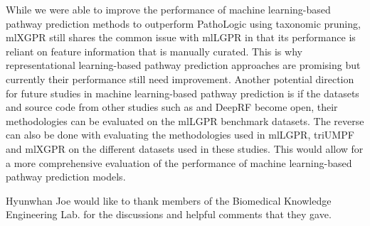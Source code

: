\documentclass[sn-mathphys,Numbered]{sn-jnl}%
\theoremstyle{thmstyleone}%
\theoremstyle{thmstyletwo}%
\theoremstyle{thmstylethree}%
\begin{document}
While we were able to improve the performance of machine learning-based pathway prediction methods to outperform PathoLogic using taxonomic pruning, mlXGPR still shares the common issue with mlLGPR in that its performance is reliant on feature information that is manually curated.
This is why representational learning-based pathway prediction approaches are promising but currently their performance still need improvement.
Another potential direction for future studies in machine learning-based pathway prediction is if the datasets and source code from other studies such as \cite{aljarbouDeterminingPresenceMetabolic2020} and DeepRF \cite{shahDeepRFDeepLearning2022} become open, their methodologies can be evaluated on the mlLGPR benchmark datasets.
The reverse can also be done with evaluating the methodologies used in mlLGPR, triUMPF and mlXGPR on the different datasets used in these studies.
This would allow for a more comprehensive evaluation of the performance of machine learning-based pathway prediction models.
\backmatter





Hyunwhan Joe would like to thank members of the Biomedical Knowledge Engineering Lab. for the discussions and helpful comments that they gave.
\end{document}
